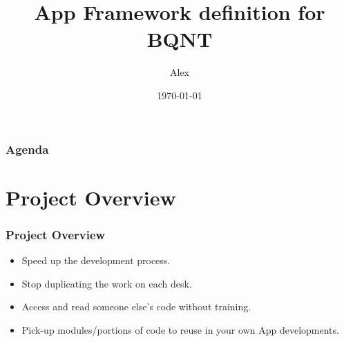 \documentclass{beamer}
\title[Short title]{App Framework definition for BQNT} %
\author{Alex} %
\institute[Bloomberg LP] %
{
\medskip
\textit{Bloomberg LP} %
}
\date{\today} %
\begin{document}
\begin{frame}
\titlepage %
\end{frame}

\begin{frame}
\frametitle{Agenda} %
\tableofcontents %
\end{frame}


\section{Project Overview} %


\begin{frame}
\frametitle{Project Overview}
\begin{itemize}
\item Speed up the development process.
\item Stop duplicating the work on each desk.
\item Access and read someone else's code without training.
\item Pick-up modules/portions of code to reuse in your own App developments.
\end{itemize}
\end{frame}
\end{document}
